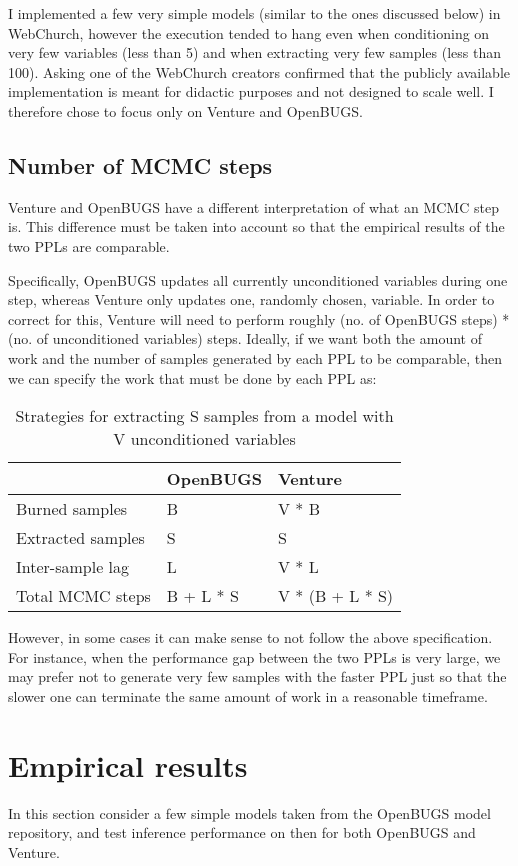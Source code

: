 I implemented a few very simple models (similar to the ones discussed below) in WebChurch, however the execution tended to hang even when conditioning on very few variables (less than 5) and when extracting very few samples (less than 100). Asking one of the WebChurch creators confirmed that the publicly available implementation is meant for didactic purposes and not designed to scale well. I therefore chose to focus only on Venture and OpenBUGS.

\subsection{Number of MCMC steps}
Venture and OpenBUGS have a different interpretation of what an MCMC step is. This difference must be taken into account so that the empirical results of the two PPLs are comparable.

Specifically, OpenBUGS updates all currently unconditioned variables during one step, whereas Venture only updates one, randomly chosen, variable. In order to correct for this, Venture will need to perform roughly (no. of OpenBUGS steps) * (no. of unconditioned variables) steps. Ideally, if we want both the amount of work and the number of samples generated by each PPL to be comparable, then we can specify the work that must be done by each PPL as:

\begin{table}[H]
  \centering
  \begin{tabular}{lll}
    \toprule
    & OpenBUGS & Venture \\
    \midrule
    Burned samples & B & V * B \\
    Extracted samples & S & S \\
    Inter-sample lag & L & V * L \\
    Total MCMC steps & B + L * S & V * (B + L * S) \\
    \bottomrule
  \end{tabular}
  \caption{Strategies for extracting S samples from a model with V unconditioned variables}
  \label{tab:noSteps}
\end{table}

However, in some cases it can make sense to not follow the above specification. For instance, when the performance gap between the two PPLs is very large, we may prefer not to generate very few samples with the faster PPL just so that the slower one can terminate the same amount of work in a reasonable timeframe. 

\section{Empirical results}
In this section consider a few simple models taken from the OpenBUGS model repository, and test inference performance on then for both OpenBUGS and Venture. 


